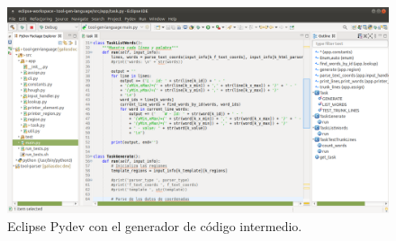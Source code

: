 \begin{figure}[hp!]
    \centering
    \includegraphics[angle=90,height=1.6\textwidth]{imaxes/z-adicional/tool-gen-language-pydev.png}
    \caption{Eclipse Pydev con el generador de código intermedio.}
    \label{fig:tool-gen-language-pydev}
\end{figure}


